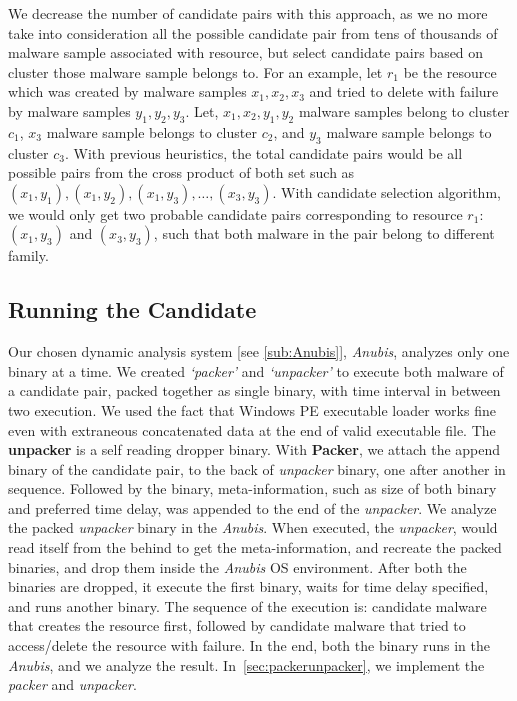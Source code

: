 We decrease the number of candidate pairs with this approach, as we no more take into consideration all the possible candidate pair from tens of thousands of malware sample associated with resource, but select candidate pairs based on cluster those malware sample belongs to.
For an example, let $r_1$ be the resource which was created by malware samples $x_1,x_2,x_3$ and tried to delete with failure by malware samples $y_1, y_2, y_3$.
Let, $x_1,x_2,y_1,y_2$ malware samples belong to cluster $c_1$, $x_3$ malware sample belongs to cluster $c_2$, and $y_3$ malware sample belongs to cluster $c_3$.
With previous heuristics, the total candidate pairs would be all possible pairs from the cross product of both set such as $(x_1,y_1), (x_1,y_2), (x_1,y_3),\ldots ,(x_3, y_3)$.
With candidate selection algorithm, we would only get two probable candidate pairs corresponding to resource $r_1$: $(x_1,y_3)$ and $(x_3,y_3)$, such that both malware in the pair belong to different family.
\subsection{Running the Candidate}
\label{sub:Running the Candidate}
Our chosen dynamic analysis system [see \autoref{sub:Anubis}], \emph{Anubis}, analyzes only one binary at a time.
We created \emph{`packer'} and \emph{`unpacker'} to execute both malware of a candidate pair, packed together as single binary, with time interval in between two execution.
We used the fact that Windows PE executable loader works fine even with extraneous concatenated data at the end of valid executable file.
The \textbf{unpacker} is a self reading dropper binary.
With \textbf{Packer}, we attach the append binary of the candidate pair, to the back of \emph{unpacker} binary, one after another in sequence.
Followed by the binary, meta-information, such as size of both binary and preferred time delay, was appended to the end of the \emph{unpacker}.
We analyze the packed \emph{unpacker} binary in the \emph{Anubis}.
When executed, the \emph{unpacker}, would read itself from the behind to get the meta-information, and recreate the packed binaries, and drop them inside the \emph{Anubis} OS environment.
After both the binaries are dropped, it execute the first binary, waits for time delay specified, and runs another binary.
The sequence of the execution is: candidate malware that creates the resource first, followed by candidate malware that tried to access/delete the resource with failure.
In the end, both the binary runs in the \emph{Anubis}, and we analyze the result.
In~\autoref{sec:packerunpacker}, we implement the \emph{packer} and \emph{unpacker}.
